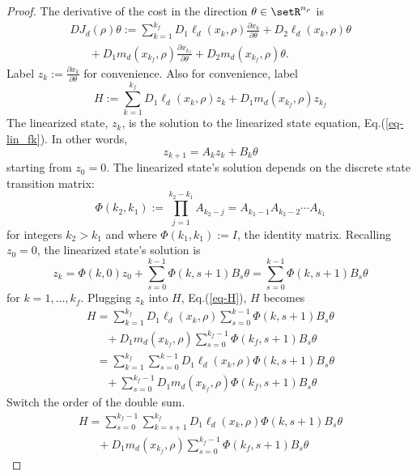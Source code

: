 \documentclass[letterpaper, 10pt, conference]{ieeeconf}
\begin{document}
\begin{proof}
The derivative of the cost in the direction $\theta\in\setR^{n_\rho}$ is
\begin{equation}
\begin{array}{l}
DJ_d(\rho)\theta:=\sum_{k=1}^{k_f}D_1\ell_d(x_k,\rho)\frac{\partial x_k}{\partial \theta} + D_2\ell_d(x_k,\rho)\theta \\\hspace{20pt}+ D_1m_d(x_{k_f},\rho)\frac{\partial x_{k_f}}{\partial \theta} + D_2m_d(x_{k_f},\rho)\theta.
\end{array}
\label{eq-DJ_dot_theta}
\end{equation}
Label $z_k:=\frac{\partial x_{k}}{\partial \theta}$ for convenience. Also for convenience, label 
\begin{equation}
H:=\sum_{k=1}^{k_f}D_1\ell_d(x_k,\rho) z_k + D_1m_d(x_{k_f},\rho) z_{k_f}
\label{eq-H}
\end{equation}
The linearized state, $z_k$, is the solution to the linearized state equation, Eq.(\ref{eq-lin_fk}).  In other words,
\[
z_{k+1} = A_kz_k + B_k\theta
\]
starting from $z_0 = 0$.  The linearized state's solution depends on the discrete state transition matrix:
\[
\Phi(k_2,k_1):=\prod_{j = 1}^{k_2-k_1} A_{k_2-j} = A_{k_2-1}A_{k_2-2}\cdots A_{k_1}
\]
for integers $k_2>k_1$ and where $\Phi(k_1,k_1):=I$, the identity matrix.  Recalling $z_0 = 0$, the linearized state's solution is
\[
z_k = \Phi(k,0)z_0 + \sum_{s = 0}^{k-1}\Phi(k,s+1)B_s\theta = \sum_{s = 0}^{k-1}\Phi(k,s+1)B_s\theta
\]
for $k = 1,\ldots,k_f$.  Plugging $z_k$ into $H$, Eq.(\ref{eq-H}), $H$ becomes
\[
\begin{array}{l}
H = \sum_{k=1}^{k_f}D_1\ell_d(x_k,\rho) \sum_{s = 0}^{k-1}\Phi(k,s+1)B_s\theta \\\hspace{20pt}+ D_1m_d(x_{k_f},\rho) \sum_{s = 0}^{k_f-1}\Phi(k_f,s+1)B_s\theta
\\\hspace{10pt} = \sum_{k=1}^{k_f}\sum_{s = 0}^{k-1}D_1\ell_d(x_k,\rho) \Phi(k,s+1) B_s\theta \\\hspace{20pt}+  \sum_{s = 0}^{k_f-1} D_1m_d(x_{k_f},\rho)\Phi(k_f,s+1)B_s\theta
\end{array}
\]
Switch the order of the double sum.  
\[
\begin{array}{l}
H = \sum_{s=0}^{k_f-1}\sum_{k = s+1}^{k_f}D_1\ell_d(x_k,\rho) \Phi(k,s+1) B_s\theta \\\hspace{20pt}+ D_1m_d(x_{k_f},\rho) \sum_{s = 0}^{k_f-1}\Phi(k_f,s+1)B_s\theta

\end{array}\]
\end{proof}
\end{document}

